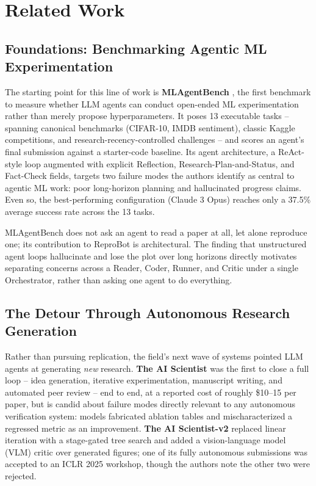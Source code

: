 \documentclass[10pt,twocolumn]{article}
\begin{document}
\section{Related Work}
\label{sec:related}

\subsection{Foundations: Benchmarking Agentic ML Experimentation}

The starting point for this line of work is \textbf{MLAgentBench}
\cite{huang2023mlagentbench}, the first benchmark to measure whether LLM agents can
conduct open-ended ML experimentation rather than merely propose hyperparameters. It
poses 13 executable tasks -- spanning canonical benchmarks (CIFAR-10, IMDB sentiment),
classic Kaggle competitions, and research-recency-controlled challenges -- and scores an
agent's final submission against a starter-code baseline. Its agent architecture, a
ReAct-style loop augmented with explicit Reflection, Research-Plan-and-Status, and
Fact-Check fields, targets two failure modes the authors identify as central to agentic
ML work: poor long-horizon planning and hallucinated progress claims. Even so, the
best-performing configuration (Claude 3 Opus) reaches only a 37.5\% average success rate
across the 13 tasks.

MLAgentBench does not ask an agent to read a paper at all, let alone reproduce one; its
contribution to ReproBot is architectural. The finding that unstructured agent loops
hallucinate and lose the plot over long horizons directly motivates separating concerns
across a Reader, Coder, Runner, and Critic under a single Orchestrator, rather than
asking one agent to do everything.

\subsection{The Detour Through Autonomous Research Generation}

Rather than pursuing replication, the field's next wave of systems pointed LLM agents at
generating \emph{new} research. \textbf{The AI Scientist} \cite{lu2024aiscientist} was
the first to close a full loop -- idea generation, iterative experimentation, manuscript
writing, and automated peer review -- end to end, at a reported cost of roughly \$10--15
per paper, but is candid about failure modes directly relevant to any autonomous
verification system: models fabricated ablation tables and mischaracterized a regressed
metric as an improvement. \textbf{The AI Scientist-v2} \cite{yamada2025aiscientistv2}
replaced linear iteration with a stage-gated tree search and added a vision-language
model (VLM) critic over generated figures; one of its fully autonomous submissions was
accepted to an ICLR 2025 workshop, though the authors note the other two were rejected.
\end{document}
